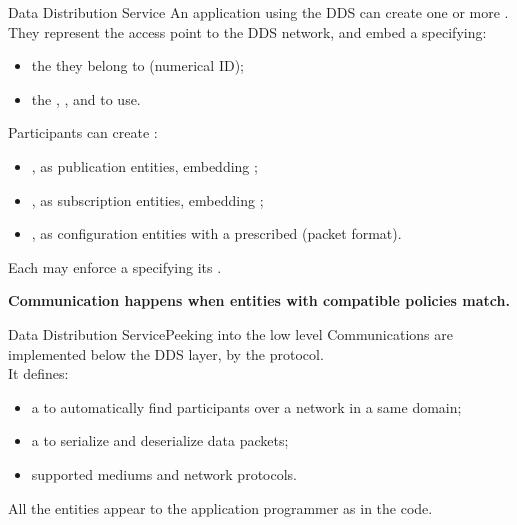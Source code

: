 \begin{frame}{Data Distribution Service}
  \justifying
	An application using the DDS can create one or more .\\
	They represent the access point to the DDS network, and embed a  specifying:
	\begin{itemize}
		\item the  they belong to (numerical ID);
		\item the , , and  to use.
	\end{itemize}
	\bigskip
	Participants can create :
	\begin{itemize}
		\item {}, as publication entities, embedding ;
		\item {}, as subscription entities, embedding ;
		\item {}, as configuration entities with a prescribed  (packet format).
	\end{itemize}
	Each may enforce a  specifying its .
	\begin{block}{}
		\centering
		\textbf{Communication happens when entities with compatible policies match.}
	\end{block}
\end{frame}
\begin{frame}{Data Distribution Service}{Peeking into the low level}
  \justifying
	Communications are implemented below the DDS layer, by the  protocol.\\
	It defines:
	\begin{itemize}
		\item a  to automatically find participants over a network in a same domain;
		\item a  to serialize and deserialize data packets;
		\item supported mediums and network protocols.
	\end{itemize}
	\bigskip
	All the entities appear to the application programmer as  in the code.
\end{frame}
